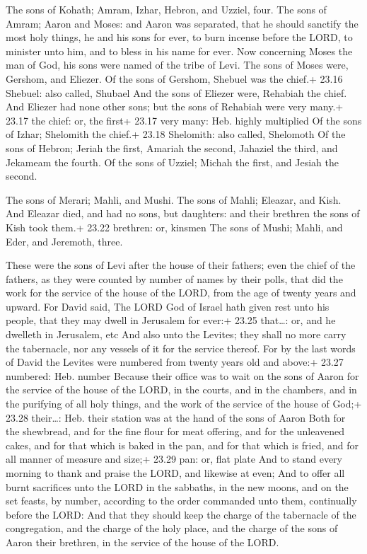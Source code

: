  The sons of Kohath; Amram, Izhar, Hebron, and Uzziel,
four.  The sons of Amram; Aaron and Moses: and Aaron was
separated, that he should sanctify the most holy things, he and his sons
for ever, to burn incense before the LORD, to minister unto him, and to
bless in his name for ever.  Now concerning Moses the man
of God, his sons were named of the tribe of Levi.  The sons
of Moses were, Gershom, and Eliezer.  Of the sons of
Gershom, Shebuel was the chief.+ 23.16 Shebuel: also called, Shubael
 And the sons of Eliezer were, Rehabiah the chief. And
Eliezer had none other sons; but the sons of Rehabiah were very many.+
23.17 the chief: or, the first+ 23.17 very many: Heb. highly multiplied
 Of the sons of Izhar; Shelomith the chief.+ 23.18
Shelomith: also called, Shelomoth  Of the sons of Hebron;
Jeriah the first, Amariah the second, Jahaziel the third, and Jekameam
the fourth.  Of the sons of Uzziel; Michah the first, and
Jesiah the second.

 The sons of Merari; Mahli, and Mushi. The sons of Mahli;
Eleazar, and Kish.  And Eleazar died, and had no sons, but
daughters: and their brethren the sons of Kish took them.+ 23.22
brethren: or, kinsmen  The sons of Mushi; Mahli, and Eder,
and Jeremoth, three.

 These were the sons of Levi after the house of their
fathers; even the chief of the fathers, as they were counted by number
of names by their polls, that did the work for the service of the house
of the LORD, from the age of twenty years and upward.  For
David said, The LORD God of Israel hath given rest unto his people, that
they may dwell in Jerusalem for ever:+ 23.25 that\ldots: or, and he
dwelleth in Jerusalem, etc  And also unto the Levites; they
shall no more carry the tabernacle, nor any vessels of it for the
service thereof.  For by the last words of David the
Levites were numbered from twenty years old and above:+ 23.27 numbered:
Heb. number  Because their office was to wait on the sons
of Aaron for the service of the house of the LORD, in the courts, and in
the chambers, and in the purifying of all holy things, and the work of
the service of the house of God;+ 23.28 their\ldots: Heb. their station
was at the hand of the sons of Aaron  Both for the
shewbread, and for the fine flour for meat offering, and for the
unleavened cakes, and for that which is baked in the pan, and for that
which is fried, and for all manner of measure and size;+ 23.29 pan: or,
flat plate  And to stand every morning to thank and praise
the LORD, and likewise at even;  And to offer all burnt
sacrifices unto the LORD in the sabbaths, in the new moons, and on the
set feasts, by number, according to the order commanded unto them,
continually before the LORD:  And that they should keep the
charge of the tabernacle of the congregation, and the charge of the holy
place, and the charge of the sons of Aaron their brethren, in the
service of the house of the LORD.

